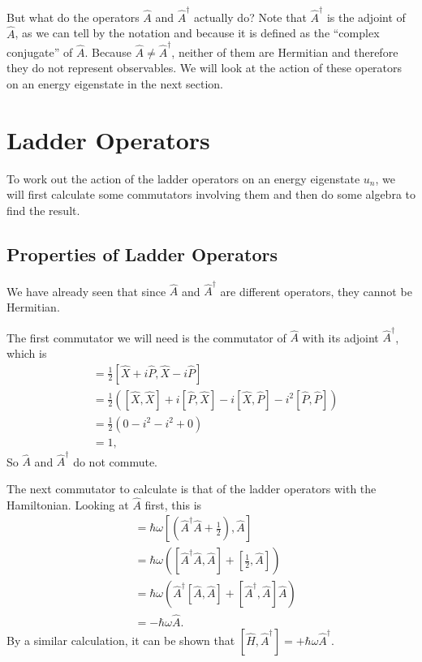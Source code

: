 \documentclass[../quantum_mechanics.tex]{subfiles}
\begin{document}
            But what do the operators $\hat{A}$ and $\hat{A}^\dagger$ actually do?
            Note that $\hat{A}^\dagger$ is the adjoint of $\hat{A}$, as we can tell by the notation and because it is defined as the ``complex conjugate'' of $\hat{A}$.
            Because $\hat{A}\neq\hat{A}^\dagger$, neither of them are Hermitian and therefore they do not represent observables.
            We will look at the action of these operators on an energy eigenstate in the next section.

    \section{Ladder Operators}\label{sec:ladder-operators}
        To work out the action of the ladder operators on an energy eigenstate $u_n$, we will first calculate some commutators involving them and then do some algebra to find the result.
        
        \subsection{Properties of Ladder Operators}\label{subsec:properties-of-ladder-operators}
            We have already seen that since $\hat{A}$ and $\hat{A}^\dagger$ are different operators, they cannot be Hermitian.

            The first commutator we will need is the commutator of $\hat{A}$ with its adjoint $\hat{A}^\dagger$, which is
            \begin{align}
                [\hat{A},\hat{A}^\dagger]&=\frac{1}{2}[\hat{X}+i\hat{P},\hat{X}-i\hat{P}]\\
                &=\frac{1}{2}([\hat{X},\hat{X}]+i[\hat{P},\hat{X}]-i[\hat{X},\hat{P}]-i^2[\hat{P},\hat{P}])\\
                &=\frac{1}{2}(0-i^2-i^2+0)\\
                &=1,
            \end{align}
            So $\hat{A}$ and $\hat{A}^\dagger$ do not commute.

            The next commutator to calculate is that of the ladder operators with the Hamiltonian.
            Looking at $\hat{A}$ first, this is
            \begin{align}
                [\hat{H},\hat{A}]&=\hbar\omega\left[\left(\hat{A}^\dagger\hat{A}+\frac{1}{2}\right),\hat{A}\right]\\
                &=\hbar\omega\left([\hat{A}^\dagger\hat{A},\hat{A}]+\left[\frac{1}{2},\hat{A}\right]\right)\\
                &=\hbar\omega(\hat{A}^\dagger[\hat{A},\hat{A}]+[\hat{A}^\dagger,\hat{A}]\hat{A})\\
                &=-\hbar\omega\hat{A}.
            \end{align}
            By a similar calculation, it can be shown that $[\hat{H},\hat{A}^\dagger]=+\hbar\omega\hat{A}^\dagger$.
\end{document}
